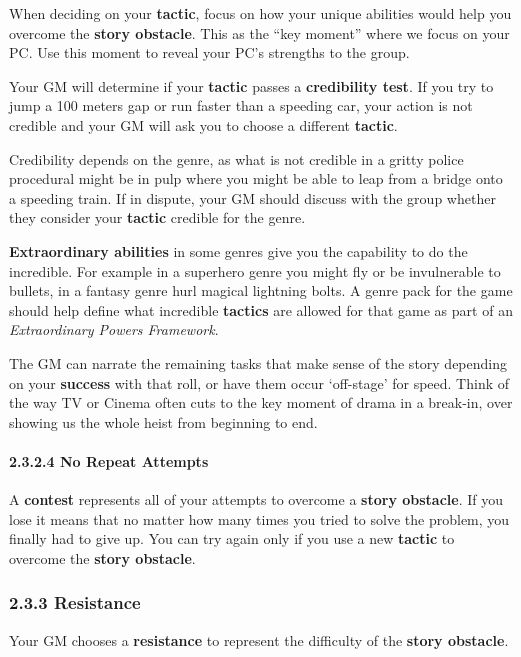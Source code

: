 \documentclass[
]{article}
\begin{document}
When deciding on your \textbf{tactic}, focus on how your unique
abilities would help you overcome the \textbf{story obstacle}. This as
the ``key moment'' where we focus on your PC. Use this moment to reveal
your PC's strengths to the group.

Your GM will determine if your \textbf{tactic} passes a
\textbf{credibility test}. If you try to jump a 100 meters gap or run
faster than a speeding car, your action is not credible and your GM will
ask you to choose a different \textbf{tactic}.

Credibility depends on the genre, as what is not credible in a gritty
police procedural might be in pulp where you might be able to leap from
a bridge onto a speeding train. If in dispute, your GM should discuss
with the group whether they consider your \textbf{tactic} credible for
the genre.

\textbf{Extraordinary abilities} in some genres give you the capability
to do the incredible. For example in a superhero genre you might fly or
be invulnerable to bullets, in a fantasy genre hurl magical lightning
bolts. A genre pack for the game should help define what incredible
\textbf{tactics} are allowed for that game as part of an
\emph{Extraordinary Powers Framework}.

The GM can narrate the remaining tasks that make sense of the story
depending on your \textbf{success} with that roll, or have them occur
`off-stage' for speed. Think of the way TV or Cinema often cuts to the
key moment of drama in a break-in, over showing us the whole heist from
beginning to end.

\hypertarget{no-repeat-attempts}{%
\paragraph{2.3.2.4 No Repeat Attempts}\label{no-repeat-attempts}}

A \textbf{contest} represents all of your attempts to overcome a
\textbf{story obstacle}. If you lose it means that no matter how many
times you tried to solve the problem, you finally had to give up. You
can try again only if you use a new \textbf{tactic} to overcome the
\textbf{story obstacle}.

\hypertarget{resistance}{%
\subsubsection{2.3.3 Resistance}\label{resistance}}

Your GM chooses a \textbf{resistance} to represent the difficulty of the
\textbf{story obstacle}.
\end{document}

